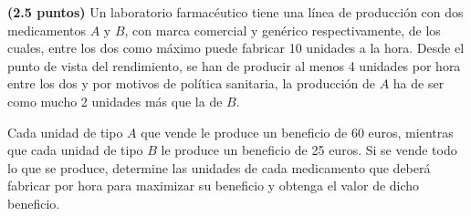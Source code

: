 
\textbf{(2.5 puntos)} Un laboratorio farmacéutico tiene una línea de producción
con dos medicamentos $A$ y $B$, con marca comercial y genérico respectivamente,
de los cuales, entre los dos como máximo puede fabricar 10 unidades a la hora.
Desde el punto de vista del rendimiento, se han de producir al menos 4 unidades
por hora entre los dos y por motivos de política sanitaria, la producción
de $A$ ha de ser como mucho 2 unidades más que la de $B$.

Cada unidad de tipo $A$ que vende le produce un beneficio de 60 euros,
mientras que cada unidad de tipo $B$ le produce un beneficio de 25 euros.
Si se vende todo lo que se produce, determine las unidades de cada medicamento
que deberá fabricar por hora para maximizar su beneficio y obtenga el valor
de dicho beneficio.
